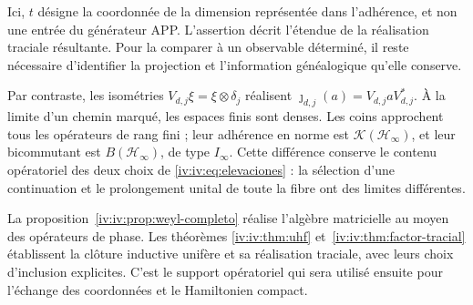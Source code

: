 Ici, \(t\) désigne la coordonnée de la dimension représentée
dans l’adhérence, et non une entrée du générateur APP. L’assertion
décrit l’étendue de la réalisation traciale résultante. Pour
la comparer à un observable déterminé, il reste nécessaire
d’identifier la projection et l’information généalogique qu’elle conserve.

Par contraste, les isométries \(V_{d,j}\xi=\xi\otimes\delta_j\) réalisent \(\jmath_{d,j}(a)=V_{d,j}aV_{d,j}^*\). À la limite d'un chemin marqué, les espaces finis sont denses. Les coins approchent tous les opérateurs de rang fini ; leur adhérence en norme est \(\mathcal K(\mathcal H_\infty)\), et leur bicommutant est \(B(\mathcal H_\infty)\), de type \(I_\infty\). Cette différence conserve le contenu opératoriel des deux choix de \eqref{iv:iv:eq:elevaciones} : la sélection d'une continuation et le prolongement unital de toute la fibre ont des limites différentes.

La proposition~\ref{iv:iv:prop:weyl-completo} réalise l’algèbre
matricielle au moyen des opérateurs de phase. Les théorèmes
\ref{iv:iv:thm:uhf} et~\ref{iv:iv:thm:factor-tracial} établissent la clôture
inductive unifère et sa réalisation traciale, avec leurs choix
d’inclusion explicites. C’est le support opératoriel qui sera utilisé
ensuite pour l’échange des coordonnées et le Hamiltonien compact.
